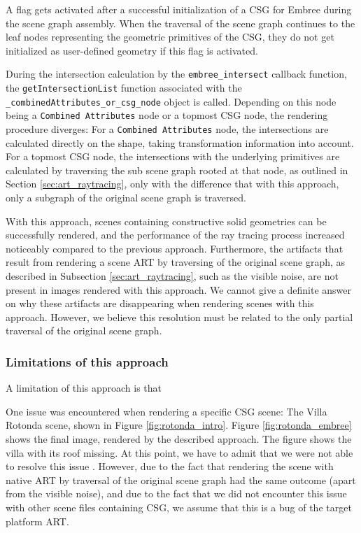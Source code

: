 A flag gets activated after a successful initialization of a CSG for Embree during the scene graph assembly. When the traversal of the scene graph continues to the leaf nodes representing the geometric primitives of the CSG, they do not get initialized as user-defined geometry if this flag is activated.

During the intersection calculation by the \texttt{embree\_intersect} callback function, the \texttt{getIntersectionList} function associated with the \texttt{\_combinedAttributes\_or\_csg\_node} object is called. Depending on this node being a \texttt{Combined Attributes} node or a topmost CSG node, the rendering procedure diverges: For a \texttt{Combined Attributes} node, the intersections are calculated directly on the shape, taking transformation information into account. For a topmost CSG node, the intersections with the underlying primitives are calculated by traversing the sub scene graph rooted at that node, as outlined in Section \ref{sec:art_raytracing}, only with the difference that with this approach, only a subgraph of the original scene graph is traversed.

With this approach, scenes containing constructive solid geometries can be successfully rendered, and the performance of the ray tracing process increased noticeably compared to the previous approach. Furthermore, the artifacts that result from rendering a scene ART by traversing of the original scene graph, as described in Subsection \ref{sec:art_raytracing}, such as the visible noise, are not present in images rendered with this approach. We cannot give a definite answer on why these artifacts are disappearing when rendering scenes with this approach. However, we believe this resolution must be related to the only partial traversal of the original scene graph.

\subsubsection{Limitations of this approach}

A limitation of this approach is that 


One issue was encountered when rendering a specific CSG scene: The Villa Rotonda scene, shown in Figure \ref{fig:rotonda_intro}. Figure \ref{fig:rotonda_embree} shows the final image, rendered by the described approach. The figure shows the villa with its roof missing. At this point, we have to admit that we were not able to resolve this issue . However, due to the fact that rendering the scene with native ART by traversal of the original scene graph had the same outcome (apart from the visible noise), and due to the fact that we did not encounter this issue with other scene files containing CSG, we assume that this is a bug of the target platform ART. 

